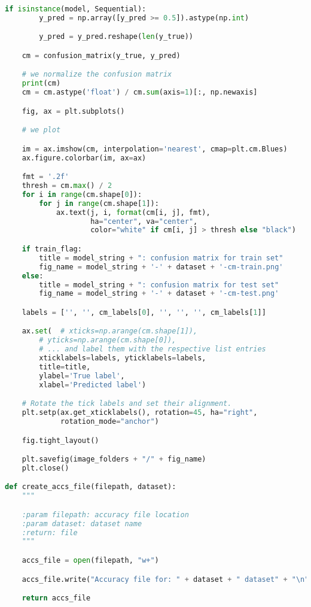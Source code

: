 \documentclass[11pt,a4paper]{article}
\begin{document}
\begin{lstlisting}[language=Python,basicstyle=\tiny]
    if isinstance(model, Sequential):
        y_pred = np.array([y_pred >= 0.5]).astype(np.int)

        y_pred = y_pred.reshape(len(y_true))

    cm = confusion_matrix(y_true, y_pred)

    # we normalize the confusion matrix
    print(cm)
    cm = cm.astype('float') / cm.sum(axis=1)[:, np.newaxis]

    fig, ax = plt.subplots()

    # we plot

    im = ax.imshow(cm, interpolation='nearest', cmap=plt.cm.Blues)
    ax.figure.colorbar(im, ax=ax)

    fmt = '.2f'
    thresh = cm.max() / 2
    for i in range(cm.shape[0]):
        for j in range(cm.shape[1]):
            ax.text(j, i, format(cm[i, j], fmt),
                    ha="center", va="center",
                    color="white" if cm[i, j] > thresh else "black")

    if train_flag:
        title = model_string + ": confusion matrix for train set"
        fig_name = model_string + '-' + dataset + '-cm-train.png'
    else:
        title = model_string + ": confusion matrix for test set"
        fig_name = model_string + '-' + dataset + '-cm-test.png'

    labels = ['', '', cm_labels[0], '', '', '', cm_labels[1]]

    ax.set(  # xticks=np.arange(cm.shape[1]),
        # yticks=np.arange(cm.shape[0]),
        # ... and label them with the respective list entries
        xticklabels=labels, yticklabels=labels,
        title=title,
        ylabel='True label',
        xlabel='Predicted label')

    # Rotate the tick labels and set their alignment.
    plt.setp(ax.get_xticklabels(), rotation=45, ha="right",
             rotation_mode="anchor")

    fig.tight_layout()

    plt.savefig(image_folders + "/" + fig_name)
    plt.close()

def create_accs_file(filepath, dataset):
    """

    :param filepath: accuracy file location
    :param dataset: dataset name
    :return: file
    """

    accs_file = open(filepath, "w+")

    accs_file.write("Accuracy file for: " + dataset + " dataset" + "\n")

    return accs_file



\end{lstlisting}
\end{document}
